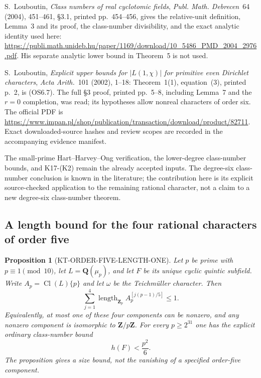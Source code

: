 \documentclass[11pt,a4paper]{article}
\newtheorem{proposition}[theorem]{Proposition}
\theoremstyle{definition}
\begin{document}
S.~Louboutin, \emph{Class numbers of real cyclotomic fields},
\emph{Publ. Math. Debrecen}~64 (2004), 451--461,
\S3.1, printed pp.~454--456, gives the relative-unit
definition, Lemma~3 and its proof, the class-number
divisibility, and the exact analytic identity used here:
\url{https://publi.math.unideb.hu/paper/1169/download/10_5486_PMD_2004_2976.pdf}.
His separate analytic lower bound in Theorem~5 is not used.

S.~Louboutin, \emph{Explicit upper bounds for $|L(1,\chi)|$
for primitive even Dirichlet characters},
\emph{Acta Arith.}~101 (2002), 1--18:
Theorem~1(1), equation~(3), printed p.~2, is (OS6.7).
The full \S3 proof, printed pp.~5--8, including Lemma~7
and the $r=0$ completion, was read; its hypotheses allow
nonreal characters of order six.  The official PDF is
\url{https://www.impan.pl/shop/publication/transaction/download/product/82711}.
Exact downloaded-source hashes and review scopes are
recorded in the accompanying evidence manifest.

The small-prime Hart--Harvey--Ong verification, the lower-degree
class-number bounds, and K17-(K2) remain the already accepted
inputs.  The degree-six class-number conclusion is known in the
literature; the contribution here is its explicit source-checked
application to the remaining rational character, not a claim to
a new degree-six class-number theorem.



\subsection{A length bound for the four rational characters of order five}

\begin{proposition}[KT-ORDER-FIVE-LENGTH-ONE]
Let $p$ be prime with $p\equiv1\pmod {10}$, let
$L=\mathbf Q(\mu_p)$, and let $F$ be its unique cyclic quintic
subfield.  Write $A_p=\operatorname{Cl}(L)\{p\}$ and let $\omega$
be the Teichm\"uller character.  Then
\[
 \sum_{j=1}^4
 \operatorname{length}_{\mathbf Z_p}
 A_p^{[j(p-1)/5]}\le1.                         \tag{O5.1}
\]
Equivalently, at most one of these four components can be nonzero,
and any nonzero component is isomorphic to $\mathbf Z/p\mathbf Z$.
For every $p\ge2^{31}$ one has the explicit ordinary class-number bound
\[
                         h(F)<\frac{p^2}{6}.   \tag{O5.2}
\]
The proposition gives a size bound, not the vanishing of a specified
order-five component.
\end{proposition}
\end{document}
